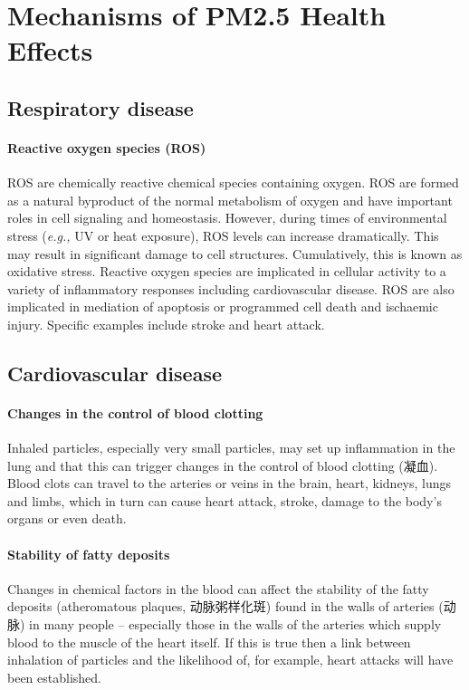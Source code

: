 \documentclass{article}
\begin{document}
\section{Mechanisms of PM2.5 Health Effects}

\subsection{Respiratory disease}

\paragraph{Reactive oxygen species (ROS)} ROS are chemically reactive chemical species containing oxygen. ROS are formed as a natural byproduct of the normal metabolism of oxygen and have important roles in cell signaling and homeostasis. However, during times of environmental stress (\textit{e.g.,} UV or heat exposure), ROS levels can increase dramatically. This may result in significant damage to cell structures. Cumulatively, this is known as oxidative stress. Reactive oxygen species are implicated in cellular activity to a variety of inflammatory responses including cardiovascular disease. ROS are also implicated in mediation of apoptosis or programmed cell death and ischaemic injury. Specific examples include stroke and heart attack.

\subsection{Cardiovascular disease}

\paragraph{Changes in the control of blood clotting}  Inhaled particles, especially very small particles, may set up inflammation in the lung and that this can trigger changes in the control of blood clotting (凝血). Blood clots can travel to the arteries or veins in the brain, heart, kidneys, lungs and limbs, which in turn can cause heart attack, stroke, damage to the body's organs or even death.

\paragraph{Stability of fatty deposits}  Changes in chemical factors in the blood can affect the stability of the fatty deposits (atheromatous plaques, 动脉粥样化斑) found in the walls of arteries (动脉) in many people -- especially those in the walls of the arteries which supply blood to the muscle of the heart itself. If this is true then a link between inhalation of particles and the likelihood of, for example, heart attacks will have been established.
\end{document}
